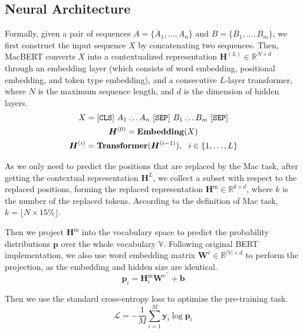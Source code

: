 \documentclass[journal]{IEEEtran}
\begin{document}
\begin{CJK*}{UTF8}{gbsn}
\subsection{Neural Architecture}
Formally, given a pair of sequences $A=\{A_1,\dots,A_n\}$ and $B=\{B_1,\dots,B_m\}$, we first construct the input sequence $X$ by concatenating two sequences.
Then, MacBERT converts $X$ into a contextualized representation $\bm{H}^{(L)}\in\mathbb{R}^{N  \times d}$ through an embedding layer (which consists of word embedding, positional embedding, and token type embedding), and a consecutive $L$-layer transformer, where $N$ is the maximum sequence length, and $d$ is the dimension of hidden layers.
\begin{gather} 
X = {\tt [CLS]} ~{A_1 \dots A_n}~ {\tt [SEP]} ~{B_1 \dots B_m}~ {\tt [SEP]} \\
\bm{H}^{(0)} = \mathbf{Embedding}( X ) \\
\bm{H}^{(i)} = \mathbf{Transformer}(\bm{H}^{(i-1)}),~~i \in \{1,\dots,L\}
\end{gather}

As we only need to predict the positions that are replaced by the Mac task, after getting the contextual representation $\bm{H}^L$, we collect a subset with respect to the replaced positions, forming the replaced representation $\bm{H}^\text{m} \in \mathbb{R}^{k \times d}$, where $k$ is the number of the replaced tokens.
According to the definition of Mac task, $k=\lfloor N \times 15\% \rfloor$.

Then we project $\bm{H}^\text{m}$ into the vocabulary space to predict the probability distributions $\bm{p}$ over the whole vocabulary $\mathbb{V}$.
Following original BERT implementation, we also use word embedding matrix $\bm{W}^\text{e} \in \mathbb{R}^{|\mathbb{V}| \times d}$ to perform the projection, as the embedding and hidden size are identical.
\begin{equation}
	\bm{p}_i = \bm{H}^\text{m}_i \bm{W}^{\text{e}^\top} + \bm{b}
\end{equation}

Then we use the standard cross-entropy loss to optimize the pre-training task.
\begin{equation}\label{equation-ce-loss}
	\mathcal{L} = -\frac{1}{M}\sum_{i=1}^M \bm{y}_i \log \bm{p}_i
\end{equation}


\end{CJK*}
\end{document}
